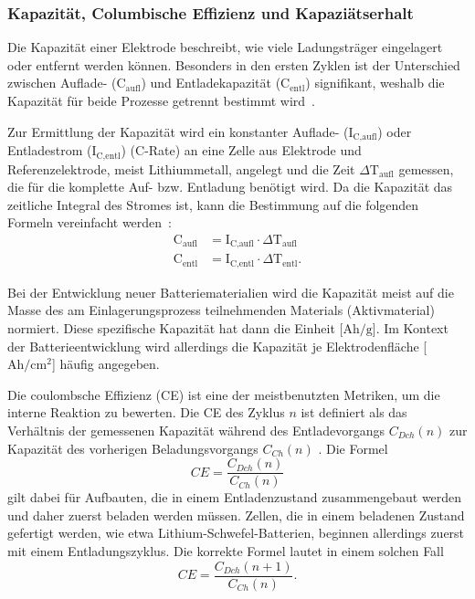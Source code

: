 \subsubsection*{Kapazität, Columbische Effizienz und Kapaziätserhalt}
Die Kapazität einer Elektrode beschreibt, wie viele Ladungsträger eingelagert oder entfernt werden können. Besonders in den ersten Zyklen ist der Unterschied zwischen Auflade- ($\text{C}_{\text{aufl}}$) und Entladekapazität ($\text{C}_{\text{entl}}$) signifikant, weshalb die Kapazität für beide Prozesse getrennt bestimmt wird~\cite{Plett2015}.

Zur Ermittlung der Kapazität wird ein konstanter Auflade- ($\text{I}_\text{C,aufl}$) oder Entladestrom ($\text{I}_\text{C,entl}$) (C-Rate) an eine Zelle aus Elektrode und Referenzelektrode, meist Lithiummetall, angelegt und die Zeit $\Delta \text{T}_\text{aufl}$ gemessen, die für die komplette Auf- bzw. Entladung benötigt wird. Da die Kapazität das zeitliche Integral des Stromes ist, kann die Bestimmung auf die folgenden Formeln vereinfacht werden~\cite{Newman2021}:
\begin{align}
	\text{C}_{\text{aufl}} &= \text{I}_\text{C,aufl} \cdot \Delta \text{T}_\text{aufl}\\
	\text{C}_{\text{entl}} &= \text{I}_\text{C,entl} \cdot \Delta \text{T}_\text{entl}.
\end{align}


Bei der Entwicklung neuer Batteriematerialien wird die Kapazität meist auf die Masse des am Einlagerungsprozess teilnehmenden Materials (Aktivmaterial) normiert. Diese spezifische Kapazität hat dann die Einheit [$\si{\A \hour \per \g}$]. Im Kontext der Batterieentwicklung wird allerdings die Kapazität je Elektrodenfläche [$\si{\A \hour \per \cm\squared}$] häufig angegeben.


Die coulombsche Effizienz (CE) ist eine der meistbenutzten Metriken, um die interne Reaktion zu bewerten. Die CE des Zyklus \( n \) ist definiert als das Verhältnis der gemessenen Kapazität während des Entladevorgangs \( C_{Dch}(n) \) zur Kapazität des vorherigen Beladungsvorgangs \( C_{Ch}(n) \) \cite{Tornheim2020}.
Die Formel
\begin{equation}
CE = \frac{C_{Dch}(n)}{C_{Ch}(n)}
\end{equation}
gilt dabei für Aufbauten, die in einem Entladenzustand zusammengebaut werden und daher zuerst beladen werden müssen. Zellen, die in einem beladenen Zustand gefertigt werden, wie etwa Lithium-Schwefel-Batterien, beginnen allerdings zuerst mit einem Entladungszyklus. Die korrekte Formel lautet in einem solchen Fall
\begin{equation}
    CE = \frac{C_{Dch}(n+1)}{C_{Ch}(n)}.
\end{equation}

